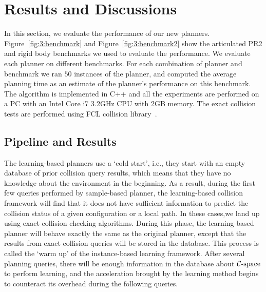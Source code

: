 \section{Results and Discussions}
\label{sec:3:results}
In this section, we evaluate the performance of our new planners. Figure~\ref{fig:3:benchmark} and Figure~\ref{fig:3:benchmark2} show the articulated PR2 and rigid body benchmarks we used to evaluate the performance. We evaluate each planner on different benchmarks. For each combination of planner and benchmark we ran $50$ instances of the planner, and computed the average planning time as an estimate of the planner's performance on this benchmark. The algorithm is implemented in C++ and all the experiments are performed on a PC with an Intel Core i7 3.2GHz CPU with 2GB memory. The exact collision tests are performed using FCL collision library~\cite{Pan:ICRA:2012}.

\subsection{Pipeline and Results}

The learning-based planners use a `cold start', i.e., they start with an empty database of prior collision query results, which means that they have no knowledge about the environment in the beginning. As a result, during the first few queries performed by sample-based planner, the learning-based collision framework will find that it does not have sufficient information to predict the collision status of a given configuration or a local path. In these cases,we land up using exact collision checking algorithms. During this phase, the learning-based planner will behave exactly the same as the original planner, except that the results from exact collision queries will be stored in the database. This process is called the `warm up' of the instance-based learning framework. After several planning queries, there will be enough information in the database about $\mathcal C\text{-space}$ to perform learning, and the acceleration brought by the learning method begins to counteract its overhead during the following queries.

